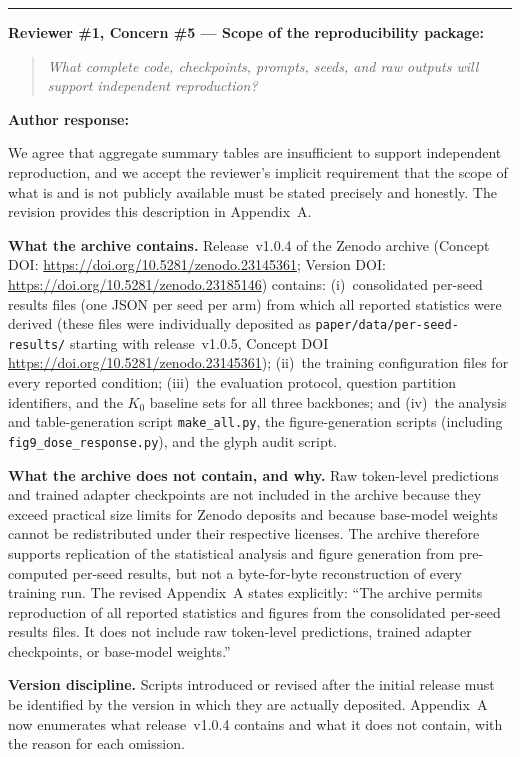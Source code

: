 \documentclass[11pt,a4paper]{article}
\newcommand{\rconcern}[3]{%
  \bigskip\noindent\rule{\linewidth}{0.4pt}\par\medskip
  \noindent\textbf{\textcolor{rccolor}{#1 --- #2:}}\par
  \smallskip
  \begin{quote}\itshape\textcolor{rccolor}{#3}\end{quote}%
}
\newcommand{\arhead}[1]{\medskip\noindent\textbf{#1}\par\smallskip}
\newcommand{\newtext}[1]{\textcolor{chgcolor}{``#1''}}
\begin{document}
\rconcern{Reviewer \#1, Concern \#5}{Scope of the reproducibility package}{What complete code, checkpoints, prompts, seeds, and raw outputs will support independent reproduction?}

\arhead{Author response:}

We agree that aggregate summary tables are insufficient to support
independent reproduction, and we accept the reviewer's implicit
requirement that the scope of what is and is not publicly available must
be stated precisely and honestly. The revision provides this description
in Appendix~A.

\textbf{What the archive contains.}
Release~v1.0.4 of the Zenodo archive (Concept DOI:
\url{https://doi.org/10.5281/zenodo.23145361};
Version DOI: \url{https://doi.org/10.5281/zenodo.23185146})
contains: (i)~consolidated per-seed results files (one JSON per seed per
arm) from which all reported statistics were derived
(these files were individually deposited as \texttt{paper/data/per-seed-results/}
starting with release~v1.0.5, Concept DOI \url{https://doi.org/10.5281/zenodo.23145361});
(ii)~the training configuration files for every reported condition;
(iii)~the evaluation protocol, question partition identifiers, and the
$K_0$ baseline sets for all three backbones; and
(iv)~the analysis and table-generation script \texttt{make\_all.py},
the figure-generation scripts (including \texttt{fig9\_dose\_response.py}),
and the glyph audit script.

\textbf{What the archive does not contain, and why.}
Raw token-level predictions and trained adapter checkpoints are not
included in the archive because they exceed practical size limits for
Zenodo deposits and because base-model weights cannot be redistributed
under their respective licenses. The archive therefore supports
replication of the statistical analysis and figure generation from
pre-computed per-seed results, but not a byte-for-byte reconstruction
of every training run. The revised Appendix~A states explicitly:
\newtext{The archive permits reproduction of all reported statistics
and figures from the consolidated per-seed results files. It does not
include raw token-level predictions, trained adapter checkpoints, or base-model
weights.}

\textbf{Version discipline.}
Scripts introduced or revised after the initial release must be
identified by the version in which they are actually deposited.
Appendix~A now enumerates what release~v1.0.4 contains and what it does
not contain, with the reason for each omission.
\end{document}
